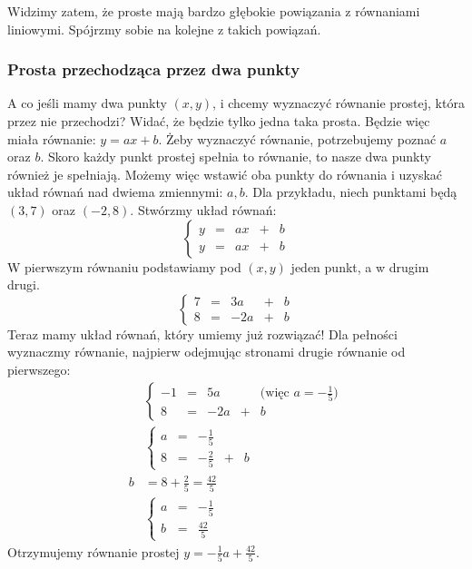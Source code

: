 \documentclass{article}
\theoremstyle{remark}
\begin{document}
Widzimy zatem, że proste mają bardzo głębokie powiązania z równaniami liniowymi.
Spójrzmy sobie na kolejne z takich powiązań.

\subsubsection{Prosta przechodząca przez dwa punkty}
A co jeśli mamy dwa punkty $(x, y)$, i chcemy wyznaczyć równanie prostej, która przez nie przechodzi?
Widać, że będzie tylko jedna taka prosta. Będzie więc miała równanie: $y=ax+b$.
Żeby wyznaczyć równanie, potrzebujemy poznać $a$ oraz $b$. Skoro każdy punkt prostej
spełnia to równanie, to nasze dwa punkty również je spełniają. Możemy więc wstawić
oba punkty do równania i uzyskać układ równań nad dwiema zmiennymi: $a, b$.
Dla przykładu, niech punktami będą $(3, 7)$ oraz $(-2, 8)$.
Stwórzmy układ równań:
\begin{displaymath}
  \left\{
    \begin{array}{lllll}
      y &=& ax &+& b\\
      y &=& ax &+& b
    \end{array}
  \right.
\end{displaymath}
W pierwszym równaniu podstawiamy pod $(x, y)$ jeden punkt, a w drugim drugi.
\begin{displaymath}
  \left\{
    \begin{array}{lllll}
      7 &=& 3a &+& b\\
      8 &=& -2a &+& b
    \end{array}
  \right.
\end{displaymath}
Teraz mamy układ równań, który umiemy już rozwiązać! Dla pełności wyznaczmy równanie,
najpierw odejmując stronami drugie równanie od pierwszego:
\begin{align*}
  &\left\{
    \begin{array}{lllll}
      -1 &=& 5a && \text{(więc $a=-\frac15$)}\\
      8 &=& -2a &+& b
    \end{array}
  \right.\\
  &\left\{
    \begin{array}{lllll}
      a &=& -\frac15 &&\\[5px]
      8 &=& -\frac25 &+& b
    \end{array}
  \right.\\
  b&=8 + \frac25=\frac{42}5\\
  &\left\{
    \begin{array}{lllll}
      a &=& -\frac15 &&\\[5px]
      b &=& \frac{42}5 &&
    \end{array}
  \right.
\end{align*}
Otrzymujemy równanie prostej $y=-\frac15a + \frac{42}5$.
\end{document}
